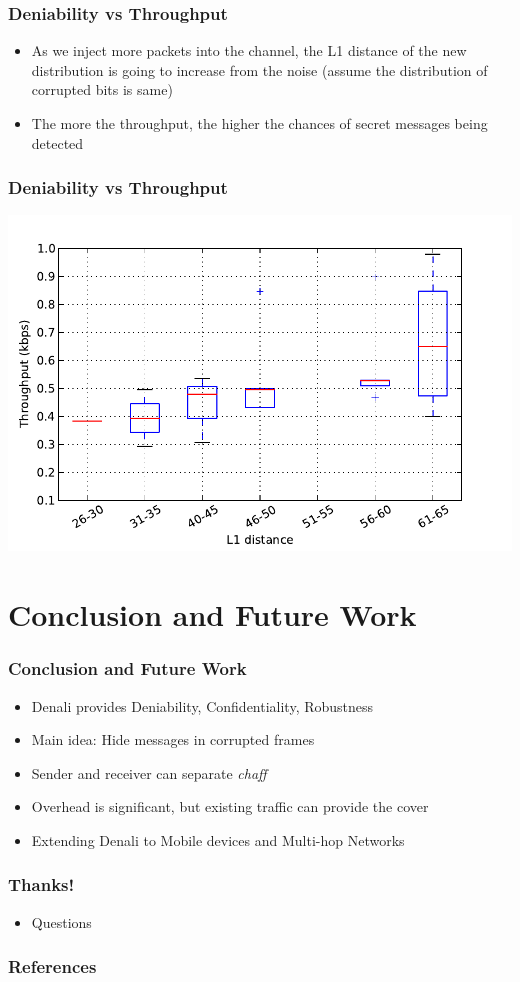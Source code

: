 \documentclass{beamer}
\begin{document}
\begin{frame}
  \frametitle{Deniability vs Throughput}
    \begin{itemize}
    \item  As we inject more packets into the channel, the L1 distance
      of the new distribution is going to increase from the noise
      (assume the distribution of corrupted bits is same)
    \item The more the throughput, the higher the chances of secret
      messages being detected
    \end{itemize}
\end{frame}

\begin{frame}
  \frametitle{Deniability vs Throughput}
  \centering
  \includegraphics[width=.8\textwidth]{images/bw_l1_var}
\end{frame}

\section{Conclusion and Future Work}
\begin{frame}
  \frametitle{Conclusion and Future Work}
  \begin{itemize}
  \item Denali provides Deniability, Confidentiality, Robustness
  \item Main idea: Hide messages in corrupted frames
  \item Sender and receiver can separate \textit{chaff}
  \item Overhead is significant, but existing traffic can provide the cover
  \item Extending Denali to Mobile devices and Multi-hop Networks
  \end{itemize}
\end{frame}

\begin{frame}
  \frametitle{Thanks!}
    \begin{itemize}
    \item Questions
    \end{itemize}
\end{frame}

\begin{frame}[allowframebreaks]
\frametitle{References}


\end{frame}
\end{document}
